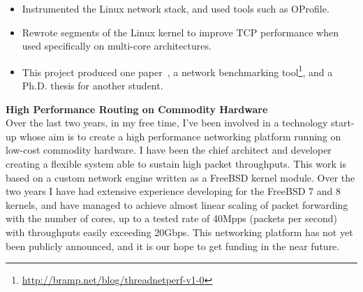 \documentclass[a4paper,10pt]{article}
\begin{document}
\begin{itemize}
 \item Instrumented the Linux network stack, and used tools such as OProfile.
 \item Rewrote segments of the Linux kernel to improve TCP performance when used specifically on multi-core architectures.
 \item This project produced one paper~\cite{faulkner2009epn}, a network benchmarking tool\footnote{\href{http://bramp.net/blog/threadnetperf-v1-0}{http://bramp.net/blog/threadnetperf-v1-0}}, and a Ph.D. thesis for another student.
\end{itemize}
\vspace{1em}

\textbf{High Performance Routing on Commodity Hardware}\\
 Over the last two years, in my free time, I've been involved in a technology start-up whose aim is to create a high performance networking platform running on low-cost commodity hardware. I have been the chief architect and developer creating a flexible system able to sustain high packet throughputs. This work is based on a custom network engine written as a FreeBSD kernel module. Over the two years I have had extensive experience developing for the FreeBSD 7 and 8 kernels, and have managed to achieve almost linear scaling of packet forwarding with the number of cores, up to a tested rate of 40Mpps (packets per second) with throughputs easily exceeding 20Gbps. This networking platform has not yet been publicly announced, and it is our hope to get funding in the near future.
\vspace{1em}
\end{document}
